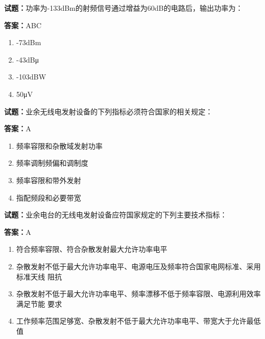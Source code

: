 \documentclass{ctexbook}
\begin{document}



\vspace{1em}

\textbf{试题：}功率为-133dBm的射频信号通过增益为60dB的电路后，输出功率为： 

\textbf{答案：}ABC 

\begin{enumerate}[leftmargin=3em]
  \item -73dBm 

  \item -43dBμ 

  \item -103dBW 

  \item 50μV 

\end{enumerate}





\vspace{1em}

\textbf{试题：}业余无线电发射设备的下列指标必须符合国家的相关规定： 

\textbf{答案：}A 

\begin{enumerate}[leftmargin=3em]
  \item 频率容限和杂散域发射功率 

  \item 频率调制频偏和调制度 

  \item 频率容限和带外发射 

  \item 指配频段和必要带宽 

\end{enumerate}





\vspace{1em}

\textbf{试题：}业余电台的无线电发射设备应符国家规定的下列主要技术指标： 

\textbf{答案：}A 

\begin{enumerate}[leftmargin=3em]
  \item 符合频率容限、符合杂散发射最大允许功率电平 

  \item 杂散发射不低于最大允许功率电平、电源电压及频率符合国家电网标准、采用标准天线
阻抗 

  \item 杂散发射不低于最大允许功率电平、频率漂移不低于频率容限、电源利用效率满足节能
要求 

  \item 工作频率范围足够宽、杂散发射不低于最大允许功率电平、带宽大于允许最低值 

\end{enumerate}
\end{document}
